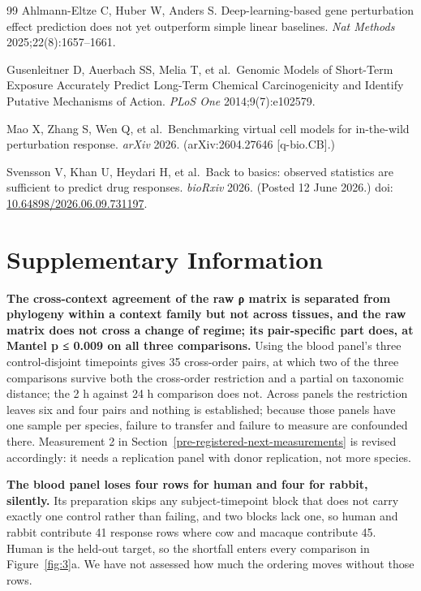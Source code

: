 \documentclass[11pt,a4paper]{article}
\begin{document}
\begin{thebibliography}{99}
Ahlmann-Eltze C, Huber W, Anders S. Deep-learning-based gene perturbation effect prediction does not yet outperform simple linear baselines. \emph{Nat Methods} 2025;22(8):1657--1661.

Gusenleitner D, Auerbach SS, Melia T, et al.~Genomic Models of Short-Term Exposure Accurately Predict Long-Term Chemical Carcinogenicity and Identify Putative Mechanisms of Action. \emph{PLoS One} 2014;9(7):e102579.

Mao X, Zhang S, Wen Q, et al.~Benchmarking virtual cell models for in-the-wild perturbation response. \emph{arXiv} 2026. (arXiv:2604.27646 {[}q-bio.CB{]}.)

Svensson V, Khan U, Heydari H, et al.~Back to basics: observed statistics are sufficient to predict drug responses. \emph{bioRxiv} 2026. (Posted 12 June 2026.) doi: \href{https://doi.org/10.64898/2026.06.09.731197}{10.64898/2026.06.09.731197}.

\end{thebibliography}
\endgroup
\clearpage


\section*{Supplementary Information}\label{supplementary-information}

\textbf{The cross-context agreement of the raw ρ matrix is separated
from phylogeny within a context family but not across tissues, and the
raw matrix does not cross a change of regime; its pair-specific part
does, at Mantel p ≤ 0.009 on all three comparisons.} Using the blood
panel's three control-disjoint timepoints gives 35 cross-order pairs, at
which two of the three comparisons survive both the cross-order
restriction and a partial on taxonomic distance; the 2 h against 24 h
comparison does not. Across panels the restriction leaves six and four
pairs and nothing is established; because those panels have one sample
per species, failure to transfer and failure to measure are confounded
there. Measurement 2 in Section~\ref{pre-registered-next-measurements} is revised accordingly: it needs a
replication panel with donor replication, not more species.

\textbf{The blood panel loses four rows for human and four for rabbit,
silently.} Its preparation skips any subject-timepoint block that does
not carry exactly one control rather than failing, and two blocks lack
one, so human and rabbit contribute 41 response rows where cow and
macaque contribute 45. Human is the held-out target, so the shortfall
enters every comparison in Figure~\ref{fig:3}a. We have not assessed how much the
ordering moves without those rows.
\end{document}
